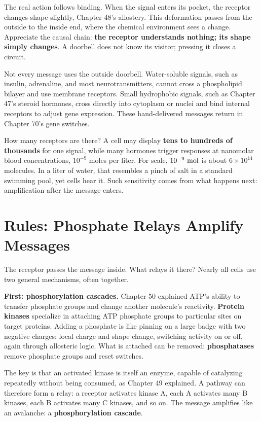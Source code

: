 The real action follows binding. When the signal enters its pocket, the receptor changes shape slightly, Chapter 48's allostery. This deformation passes from the outside to the inside end, where the chemical environment sees a change. Appreciate the causal chain: \textbf{the receptor understands nothing; its shape simply changes}. A doorbell does not know its visitor; pressing it closes a circuit.

Not every message uses the outside doorbell. Water-soluble signals, such as insulin, adrenaline, and most neurotransmitters, cannot cross a phospholipid bilayer and use membrane receptors. Small hydrophobic signals, such as Chapter 47's steroid hormones, cross directly into cytoplasm or nuclei and bind internal receptors to adjust gene expression. These hand-delivered messages return in Chapter 70's gene switches.

How many receptors are there? A cell may display \textbf{tens to hundreds of thousands} for one signal, while many hormones trigger responses at nanomolar blood concentrations, $10^{-9}$ moles per liter. For scale, $10^{-9}\ \mathrm{mol}$ is about $6\times10^{14}$ molecules. In a liter of water, that resembles a pinch of salt in a standard swimming pool, yet cells hear it. Such sensitivity comes from what happens next: amplification after the message enters.

\section{Rules: Phosphate Relays Amplify Messages}

The receptor passes the message inside. What relays it there? Nearly all cells use two general mechanisms, often together.

\textbf{First: phosphorylation cascades.} Chapter 50 explained ATP's ability to transfer phosphate groups and change another molecule's reactivity. \textbf{Protein kinases} specialize in attaching ATP phosphate groups to particular sites on target proteins. Adding a phosphate is like pinning on a large badge with two negative charges: local charge and shape change, switching activity on or off, again through allosteric logic. What is attached can be removed: \textbf{phosphatases} remove phosphate groups and reset switches.

The key is that an activated kinase is itself an enzyme, capable of catalyzing repeatedly without being consumed, as Chapter 49 explained. A pathway can therefore form a relay: a receptor activates kinase A, each A activates many B kinases, each B activates many C kinases, and so on. The message amplifies like an avalanche: a \textbf{phosphorylation cascade}.

